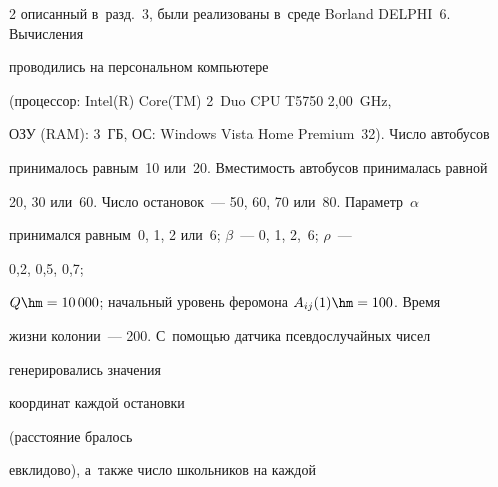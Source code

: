 \begin{multicols}{2}
описанный в~разд.~3, были реализованы в~среде Borland DELPHI~6. Вычисления

проводились на персональном компьютере

(процессор: Intel(R) Core(TM) 2~Duo CPU T5750 2,00~GHz,

ОЗУ (RAM): 3~ГБ, ОС: Windows Vista Home Premium~32). Число автобусов

принималось равным~10 или~20. Вместимость автобусов принималась равной

20, 30 или~60. Число остановок~--- 50, 60, 70 или~80. Параметр~$\alpha$

принимался равным~0, 1, 2 или~6; $\beta$~--- 0, 1, 2,~6; $\rho$~---

0,2, 0,5, 0,7;

$Q\hm = 10\,000$; начальный уровень феромона $A_{ij}(1) \hm= 100$. Время

жизни колонии~--- 200. С~помощью датчика псевдослучайных чисел

генерировались значения

 координат каждой остановки

(расстояние бралось

 евклидово), а~также чис\-ло школьников на каждой\linebreak\vspace*{-12pt}



\pagebreak



\end{multicols}



